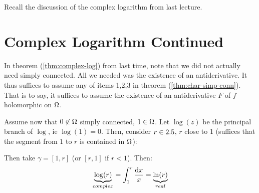 \setcounter{section}{0}
\setcounter{theorem}{0}


Recall the discussion of the complex logarithm from last lecture.

\section{Complex Logarithm Continued}

\begin{remark}
In theorem (\ref{thm:complex-log}) from last time, note that we did not actually need simply connected. All we needed was the existence of an antiderivative. It thus suffices to assume any of items 1,2,3 in theorem (\ref{thm:char-simp-conn}). That is to say, it suffices to assume the existence of an antiderivative $F$ of $f$ holomorphic on $\Omega$.

\end{remark}

Assume now that $0 \not\in \Omega$ simply connected, $1 \in \Omega$. Let $\log(z)$ be the principal branch of $\log$, ie $\log(1) = 0$. Then, consider $r \in 2.5$, $r$ close to $1$ (suffices that the segment from $1$ to $r$ is contained in $\Omega$):

\begin{center}

    
\end{center}


Then take $\gamma = [1,r]$ (or $[r,1]$ if $r< 1$). Then:
\begin{align*}
    \underbrace{\log(r)}_{complex} = \int_1^r \frac{\dif x}{x} = \underbrace{\ln(r)}_{real}
\end{align*}

